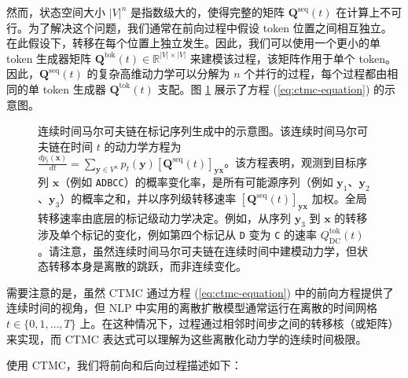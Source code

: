然而，状态空间大小 $|V|^n$ 是指数级大的，使得完整的矩阵 $\mathbf{Q}^{\mathrm{seq}}(t)$ 在计算上不可行。为了解决这个问题，我们通常在前向过程中假设 token 位置之间相互独立。在此假设下，转移在每个位置上独立发生。因此，我们可以使用一个更小的单 token 生成器矩阵 $\mathbf{Q}^{\mathrm{tok}}(t) \in \mathbb{R}^{|V| \times |V|}$ 来建模该过程，该矩阵作用于单个 token。因此，$\mathbf{Q}^{\mathrm{seq}}(t)$ 的复杂高维动力学可以分解为 $n$ 个并行的过程，每个过程都由相同的单 token 生成器 $\mathbf{Q}^{\mathrm{tok}}(t)$ 支配。图 \ref{fig:ctmc-for-sequence-generation} 展示了方程 (\ref{eq:ctmc-equation}) 的示意图。

\begin{figure}[!t]
\centering
{}
\caption{连续时间马尔可夫链在标记序列生成中的示意图。该连续时间马尔可夫链在时间 $t$ 的动力学方程为 $\frac{d p_t(\mathbf{x})}{dt} = \sum_{\mathbf{y} \in V^n} p_t(\mathbf{y}) [\mathbf{Q}^{\mathrm{seq}}(t)]_{\mathbf{y}\mathbf{x}}$。该方程表明，观测到目标序列 $\mathbf{x}$（例如 \texttt{ADBCC}）的概率变化率，是所有可能源序列（例如 $\mathbf{y}_1$、$\mathbf{y}_2$、$\mathbf{y}_3$）的概率之和，并以序列级转移速率 $[\mathbf{Q}^{\mathrm{seq}}(t)]_{\mathbf{y}\mathbf{x}}$ 加权。全局转移速率由底层的标记级动力学决定。例如，从序列 $\mathbf{y}_3$ 到 $\mathbf{x}$ 的转移涉及单个标记的变化，例如第四个标记从 \texttt{D} 变为 \texttt{C} 的速率 $Q^{\mathrm{tok}}_{\mathrm{DC}}(t)$。请注意，虽然连续时间马尔可夫链在连续时间中建模动力学，但状态转移本身是离散的跳跃，而非连续变化。}
\label{fig:ctmc-for-sequence-generation}
\end{figure}

需要注意的是，虽然 CTMC 通过方程 (\ref{eq:ctmc-equation}) 中的前向方程提供了连续时间的视角，但 NLP 中实用的离散扩散模型通常运行在离散的时间网格 $t \in \{0,1,\dots,T\}$ 上。在这种情况下，过程通过相邻时间步之间的转移核（或矩阵）来实现，而 CTMC 表达式可以理解为这些离散化动力学的连续时间极限。

使用 CTMC，我们将前向和后向过程描述如下：

